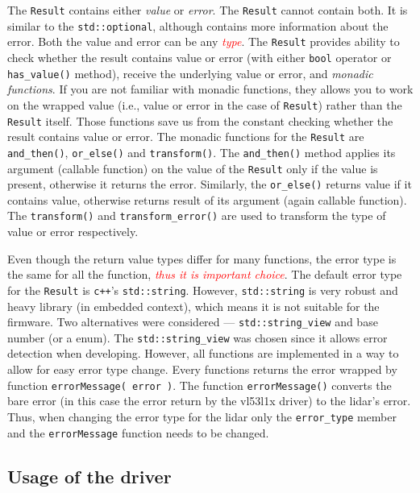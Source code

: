 \documentclass[
  digital,     %
  oneside,     %
  nosansbold,  %
  nocolorbold, %
  lof,         %
  lot,         %
]{fithesis4}
\newcommand{\TODO}[1]{\textcolor{red}{\textit{#1}}}
\begin{document}
{{{The \lstinline|Result| contains either \emph{value} or \emph{error}. The \lstinline|Result| cannot contain both. It is similar to the \lstinline|std::optional|, although contains more information about the error. Both the value and error can be any \TODO{type}. The \lstinline|Result| provides ability to check whether the result contains value or error (with either \lstinline|bool| operator or \lstinline|has_value()| method), receive the underlying value or error, and \emph{monadic functions}. If you are not familiar with monadic functions, they allows you to work on the wrapped value (i.e., value or error in the case of \lstinline|Result|) rather than the \lstinline|Result| itself. Those functions save us from the constant checking whether the result contains value or error. The monadic functions for the \lstinline|Result| are \lstinline|and_then()|, \lstinline|or_else()| and \lstinline|transform()|. The \lstinline|and_then()| method applies its argument (callable function) on the value of the \lstinline|Result| only if the value is present, otherwise it returns the error. Similarly, the \lstinline|or_else()| returns value if it contains value, otherwise returns result of its argument (again callable function). The \lstinline|transform()| and \lstinline|transform_error()| are used to transform the type of value or error respectively.

Even though the return value types differ for many functions, the error type is the same for all the function, \TODO{thus it is important choice}. The default error type for the \lstinline|Result| is \verb|c++|'s \lstinline|std::string|. However, \lstinline|std::string| is very robust and heavy library (in embedded context), which means it is not suitable for the firmware. Two alternatives were considered --- \lstinline|std::string_view| and base number (or a enum). The \lstinline|std::string_view| was chosen since it allows error detection when developing. However, all functions are implemented in a way to allow for easy error type change. Every functions returns the error wrapped by function \lstinline|errorMessage( error )|. The function \lstinline|errorMessage()| converts the bare error (in this case the error return by the \gls{vl53l1x} driver) to the \acrshort{lidar}'s error. Thus, when changing the error type for the \acrshort{lidar} only the \lstinline|error_type| member and the \lstinline|errorMessage| function needs to be changed.

\subsection{ Usage of the driver }

}}}
\end{document}

